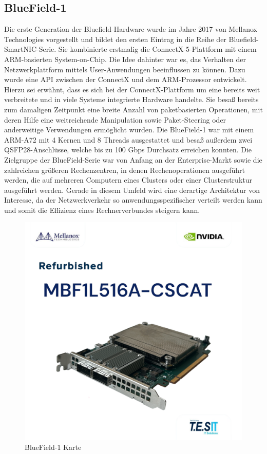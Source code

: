 \subsection{BlueField-1}
Die erste Generation der Bluefield-Hardware wurde im Jahre 2017 von Mellanox Technologies vorgestellt und bildet den ersten Eintrag in die Reihe der Bluefield-SmartNIC-Serie. Sie kombinierte erstmalig die ConnectX-5-Plattform mit einem ARM-basierten System-on-Chip. Die Idee dahinter war es, das Verhalten der Netzwerkplattform mittels User-Anwendungen beeinflussen zu können. Dazu wurde eine API zwischen der ConnectX und dem ARM-Prozessor entwickelt. Hierzu sei erwähnt, dass es sich bei der ConnectX-Plattform um eine bereits weit verbreitete und in viele Systeme integrierte Hardware handelte. Sie besaß bereits zum damaligen Zeitpunkt eine breite Anzahl von paketbasierten Operationen, mit deren Hilfe eine weitreichende Manipulation sowie Paket-Steering oder anderweitige Verwendungen ermöglicht wurden. Die BlueField-1 war mit einem ARM-A72 mit 4 Kernen und 8 Threads ausgestattet und besaß außerdem zwei QSFP28-Anschlüsse, welche bis zu 100 Gbps Durchsatz erreichen konnten. Die Zielgruppe der BlueField-Serie war von Anfang an der Enterprise-Markt sowie die zahlreichen größeren Rechenzentren, in denen Rechenoperationen ausgeführt werden, die auf mehreren Computern eines Clusters oder einer Clusterstruktur ausgeführt werden. Gerade in diesem Umfeld wird eine derartige Architektur von Interesse, da der Netzwerkverkehr so anwendungsspezifischer verteilt werden kann und somit die Effizienz eines Rechnerverbundes steigern kann. 
\begin{figure}
    \centering
    \includegraphics[width=0.65\linewidth]{images/s-l1600.png}
    \caption{BlueField-1 Karte}
    \label{fig:enter-label}
\end{figure}

